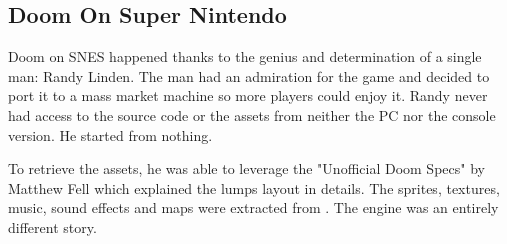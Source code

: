 \pagebreak


\par
{}
















\subsection{Doom On Super Nintendo}

Doom on SNES happened thanks to the genius and determination of a single man: Randy Linden. The man had an admiration for the game and decided to port it to a mass market machine so more players could enjoy it. Randy never had access to the source code or the assets from neither the PC nor the console version. He started from nothing.\\
\par
To retrieve the assets, he was able to leverage the "Unofficial Doom Specs" by Matthew Fell which explained the  lumps layout in details. The sprites, textures, music, sound effects and maps were extracted from . The engine was an entirely different story.\\
\par

